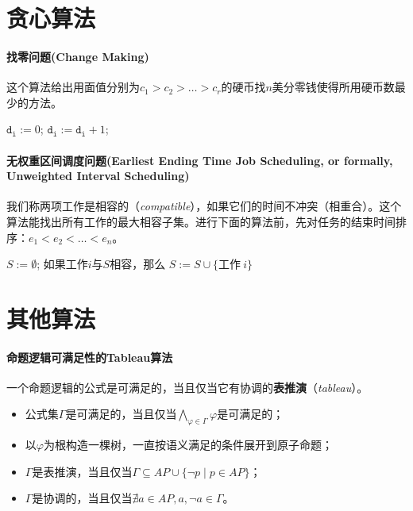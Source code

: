 \documentclass[b5paper,oneside]{ctexbook}
\begin{document}
\section{贪心算法}
\paragraph{找零问题(Change Making)}
  这个算法给出用面值分别为$c_1>c_2>\ldots>c_r$的硬币找$n$美分零钱使得所用硬币数最少的方法。
    \begin{algorithmic}
\State $\mathtt{d_i} := 0$;
\State $\mathtt{d_i} := \mathtt{d_i} + 1$;
\WhileDone
\ForDone
\EndB
\end{algorithmic}
\paragraph{无权重区间调度问题(Earliest Ending Time Job Scheduling, or formally, Unweighted Interval Scheduling)}
我们称两项工作是相容的（\emph{compatible}），如果它们的时间不冲突（相重合）。这个算法能找出所有工作的最大相容子集。进行下面的算法前，先对任务的结束时间排序：$e_1<e_2<\ldots <e_n$。
\begin{algorithmic}
\State $S:=\emptyset$;
\State 如果工作$i$与$S$相容，那么 $S:=S\cup\{\text{工作}\ i\}$
\ForDone
\EndB
\end{algorithmic}
\section{其他算法}
\paragraph{命题逻辑可满足性的Tableau算法}
一个命题逻辑的公式是可满足的，当且仅当它有协调的\textbf{表推演}（\textit{tableau}）。
\begin{itemize}
\item 公式集$\Gamma$是可满足的，当且仅当$\bigwedge\limits_{\varphi\in\Gamma}\varphi$是可满足的；
\item 以$\varphi$为根构造一棵树，一直按语义满足的条件展开到原子命题；
\item $\Gamma$是表推演，当且仅当$\Gamma\subseteq AP\cup\{\neg p\mid p\in AP\}$；
\item $\Gamma$是协调的，当且仅当$\nexists a\in AP, a,\neg a\in\Gamma$。
\end{itemize}
\end{document}
